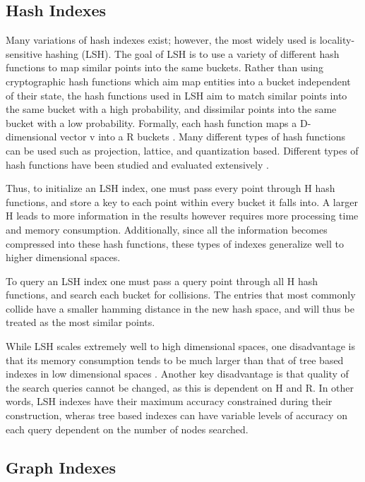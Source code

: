 \subsection{Hash Indexes}

Many variations of hash indexes exist; however, the most widely used is locality-sensitive hashing (LSH).  The goal of LSH is to use a variety of different hash functions to map similar points into the same buckets.  Rather than using cryptographic hash functions which aim map entities into a bucket independent of their state, the hash functions used in LSH aim to match similar points into the same bucket with a high probability, and dissimilar points into the same bucket with a low probability.  Formally, each hash function maps a D-dimensional vector v into a R buckets \citep{datar2004locality}.  Many different types of hash functions can be used such as projection, lattice, and quantization based.  Different types of hash functions have been studied and evaluated extensively \citep{pauleve2010locality}.

Thus, to initialize an LSH index, one must pass every point through H hash functions, and store a key to each point within every bucket it falls into.  A larger H leads to more information in the results however requires more processing time and memory consumption.  Additionally, since all the information becomes compressed into these hash functions, these types of indexes generalize well to higher dimensional spaces.

To query an LSH index one must pass a query point through all H hash functions, and search each bucket for collisions.  The entries that most commonly collide have a smaller hamming distance in the new hash space, and will thus be treated as the most similar points.

While LSH scales extremely well to high dimensional spaces, one disadvantage is that its memory consumption tends to be much larger than that of tree based indexes in low dimensional spaces \citep{datar2004locality}.  Another key disadvantage is that quality of the search queries cannot be changed, as this is dependent on H and R.  In other words, LSH indexes have their maximum accuracy constrained during their construction, wheras tree based indexes can have variable levels of accuracy on each query dependent on the number of nodes searched.

\subsection{Graph Indexes}

